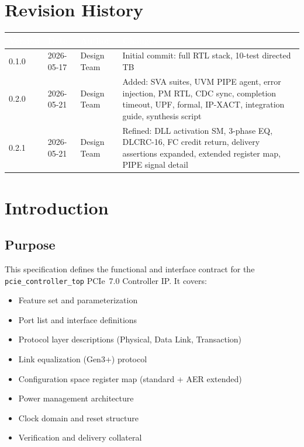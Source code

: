 \documentclass[11pt,a4paper]{article}
\newcommand{\theadcell}[1]{%
  \cellcolor{tablehead}\textcolor{white}{\textbf{#1}}}
\begin{document}
\section*{Revision History}
\begin{tabular}{llll}
  \toprule
  \theadcell{Version} & \theadcell{Date} & \theadcell{Author} & \theadcell{Changes} \\
  \midrule
  0.1.0 & 2026-05-17 & Design Team & Initial commit: full RTL stack, 10-test directed TB \\
  0.2.0 & 2026-05-21 & Design Team & Added: SVA suites, UVM PIPE agent, error injection,
                                     PM RTL, CDC sync, completion timeout, UPF, formal,
                                     IP-XACT, integration guide, synthesis script \\
  0.2.1 & 2026-05-21 & Design Team & Refined: DLL activation SM, 3-phase EQ, DLCRC-16,
                                     FC credit return, delivery assertions expanded,
                                     extended register map, PIPE signal detail \\
  \bottomrule
\end{tabular}

\tableofcontents
\newpage

\section{Introduction}

\subsection{Purpose}

This specification defines the functional and interface contract for the
\texttt{pcie\_controller\_top} PCIe~7.0 Controller IP. It covers:

\begin{itemize}[noitemsep]
  \item Feature set and parameterization
  \item Port list and interface definitions
  \item Protocol layer descriptions (Physical, Data Link, Transaction)
  \item Link equalization (Gen3+) protocol
  \item Configuration space register map (standard + AER extended)
  \item Power management architecture
  \item Clock domain and reset structure
  \item Verification and delivery collateral
\end{itemize}
\end{document}
